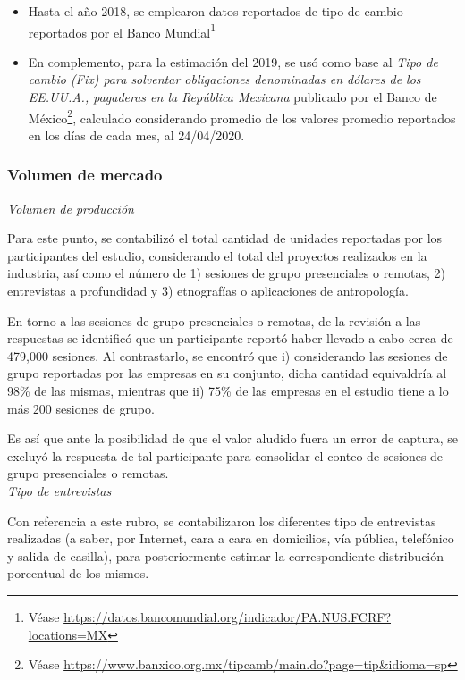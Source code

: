 \begin{itemize}
\item Hasta el año 2018, se emplearon datos reportados de tipo de cambio reportados por el Banco Mundial\footnote{Véase \url{https://datos.bancomundial.org/indicador/PA.NUS.FCRF?locations=MX}}

\item En complemento, para la estimación del 2019, se usó como base al \emph{Tipo de cambio (Fix) para solventar obligaciones denominadas en dólares de los EE.UU.A., pagaderas en la República Mexicana} publicado por el Banco de México\footnote{Véase \url{https://www.banxico.org.mx/tipcamb/main.do?page=tip&idioma=sp} }, calculado considerando promedio de los valores promedio reportados en los días de cada mes, al 24/04/2020.

\end{itemize}

\subsubsection{Volumen de mercado}

\noindent \emph{Volumen de producción}

Para este punto, se contabilizó el total cantidad de unidades reportadas por los participantes del estudio, considerando el total del proyectos realizados en la industria, así como el número de 1) sesiones de grupo presenciales o remotas, 2) entrevistas a profundidad y 3) etnografías o aplicaciones de antropología.

En torno a las sesiones de grupo presenciales o remotas, de la revisión a las respuestas se identificó que un participante reportó haber llevado a cabo cerca de 479,000 sesiones. Al contrastarlo, se encontró que i) considerando las sesiones de grupo reportadas por las empresas en su conjunto, dicha cantidad equivaldría al 98\% de las mismas, mientras que ii) 75\% de las empresas en el estudio tiene a lo más 200 sesiones de grupo.

Es así que ante la posibilidad de que el valor aludido fuera un error de captura, se excluyó la respuesta de tal participante para consolidar el conteo de sesiones de grupo presenciales o remotas.\\

\noindent \emph{Tipo de entrevistas}

Con referencia a este rubro, se contabilizaron los diferentes tipo de entrevistas realizadas (a saber, por Internet, cara a cara en domicilios, vía pública, telefónico y salida de casilla), para posteriormente estimar la correspondiente distribución porcentual de los mismos. 

